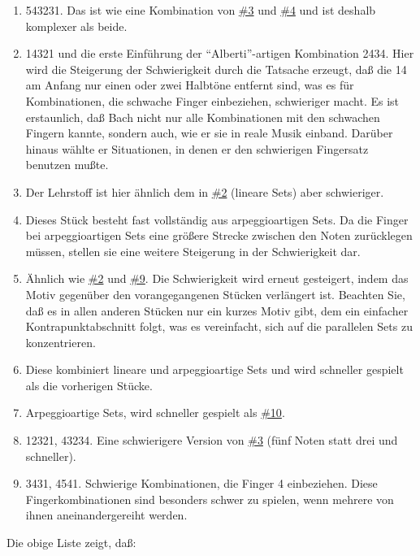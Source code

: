 \begin{enumerate}[label={\arabic*.}]
\item \label{c1iii20ps07}

543231.
Das ist wie eine Kombination von \hyperref[c1iii20ps03]{\#3} und \hyperref[c1iii20ps04]{\#4} und ist deshalb komplexer als beide.


\item \label{c1iii20ps08}

14321 und die erste Einführung der \enquote{Alberti}-artigen Kombination 2434.
Hier wird die Steigerung der Schwierigkeit durch die Tatsache erzeugt, daß die 14 am Anfang nur einen oder zwei Halbtöne entfernt sind, was es für Kombinationen, die schwache Finger einbeziehen, schwieriger macht.
Es ist erstaunlich, daß Bach nicht nur alle Kombinationen mit den schwachen Fingern kannte, sondern auch, wie er sie in reale Musik einband.
Darüber hinaus wählte er Situationen, in denen er den schwierigen Fingersatz benutzen mußte.


\item \label{c1iii20ps09}

Der Lehrstoff ist hier ähnlich dem in \hyperref[c1iii20ps02]{\#2} (lineare Sets) aber schwieriger.


\item \label{c1iii20ps10}

Dieses Stück besteht fast vollständig aus arpeggioartigen Sets.
Da die Finger bei arpeggioartigen Sets eine größere Strecke zwischen den Noten zurücklegen müssen, stellen sie eine weitere Steigerung in der Schwierigkeit dar.


\item \label{c1iii20ps11}

Ähnlich wie \hyperref[c1iii20ps02]{\#2} und \hyperref[c1iii20ps09]{\#9}.
Die Schwierigkeit wird erneut gesteigert, indem das Motiv gegenüber den vorangegangenen Stücken verlängert ist.
Beachten Sie, daß es in allen anderen Stücken nur ein kurzes Motiv gibt, dem ein einfacher Kontrapunktabschnitt folgt, was es vereinfacht, sich auf die parallelen Sets zu konzentrieren.


\item \label{c1iii20ps12}

Diese kombiniert lineare und arpeggioartige Sets und wird schneller gespielt als die vorherigen Stücke.


\item \label{c1iii20ps13}

Arpeggioartige Sets, wird schneller gespielt als \hyperref[c1iii20ps10]{\#10}.


\item \label{c1iii20ps14}

12321, 43234.
Eine schwierigere Version von \hyperref[c1iii20ps03]{\#3} (fünf Noten statt drei und schneller).


\item \label{c1iii20ps15}

3431, 4541.
Schwierige Kombinationen, die Finger 4 einbeziehen.
Diese Fingerkombinationen sind besonders schwer zu spielen, wenn mehrere von ihnen aneinandergereiht werden.

 \end{enumerate}
Die obige Liste zeigt, daß:

